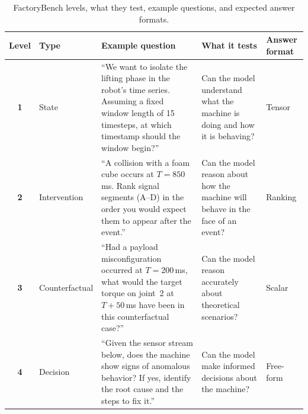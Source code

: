 \documentclass{article}
\begin{document}
\begin{table}[htbp]
    \centering
    \caption{FactoryBench levels, what they test, example questions, and expected answer formats.}
    \label{tab:levels_examples}
    \footnotesize
    \setlength{\tabcolsep}{4pt}
    \renewcommand{\arraystretch}{1.15}
    \begin{tabular}{@{}c l >{\raggedright\arraybackslash}p{4.6cm} >{\raggedright\arraybackslash}p{3.0cm} >{\raggedright\arraybackslash}p{1.7cm}@{}}
        \toprule
        Level      & Type           & Example question                                                                                                                                                 & What it tests                                                                   & Answer format \\
        \midrule
        \textbf{1} & State          & ``We want to isolate the lifting phase in the robot's time series. Assuming a fixed window length of 15 timesteps, at which timestamp should the window begin?'' & Can the model understand what the machine is doing and how it is behaving?      & Tensor        \\
        \textbf{2} & Intervention   & ``A collision with a foam cube occurs at $T{=}850$\,ms. Rank signal segments (A--D) in the order you would expect them to appear after the event.''              & Can the model reason about how the machine will behave in the face of an event? & Ranking       \\
        \textbf{3} & Counterfactual & ``Had a payload misconfiguration occurred at $T{=}200$\,ms, what would the target torque on joint~2 at $T{+}50$\,ms have been in this counterfactual case?''     & Can the model reason accurately about theoretical scenarios?                    & Scalar        \\
        \textbf{4} & Decision       & ``Given the sensor stream below, does the machine show signs of anomalous behavior? If yes, identify the root cause and the steps to fix it.''                   & Can the model make informed decisions about the machine?                        & Free-form     \\
        \bottomrule
    \end{tabular}
\end{table}
\end{document}
